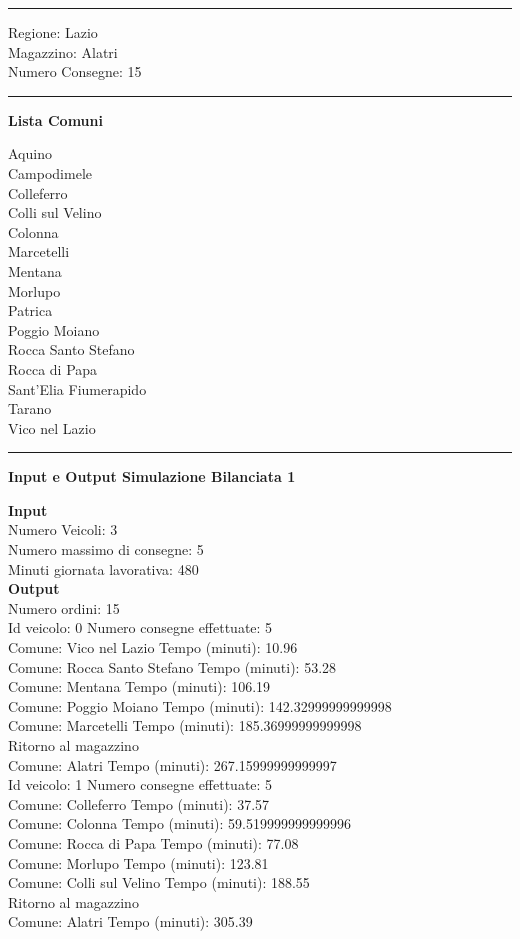 \documentclass[a4paper,12pt]{report}
\begin{document}
\hrule
Regione: Lazio\\
Magazzino: Alatri\\
Numero Consegne: 15\\
\hrule
\begin{center}
\textbf{Lista Comuni}
\end{center}
Aquino\\
Campodimele\\
Colleferro\\
Colli sul Velino\\
Colonna\\
Marcetelli\\
Mentana\\
Morlupo\\
Patrica\\
Poggio Moiano\\
Rocca Santo Stefano\\
Rocca di Papa\\
Sant'Elia Fiumerapido\\
Tarano\\
Vico nel Lazio\\
\hrule
\begin{center}
\textbf{Input e Output Simulazione Bilanciata 1}
\end{center}
\textbf{Input}\\
Numero Veicoli: 3\\
Numero massimo di consegne: 5\\
Minuti giornata lavorativa: 480\\
\textbf{Output}\\
Numero ordini: 15\\

Id veicolo: 0	Numero consegne effettuate: 5\\
Comune: Vico nel Lazio	 Tempo (minuti): 10.96\\
Comune: Rocca Santo Stefano	 Tempo (minuti): 53.28\\
Comune: Mentana	 Tempo (minuti): 106.19\\
Comune: Poggio Moiano	 Tempo (minuti): 142.32999999999998\\
Comune: Marcetelli	 Tempo (minuti): 185.36999999999998\\
Ritorno al magazzino\\
Comune: Alatri	 Tempo (minuti): 267.15999999999997\\

Id veicolo: 1	Numero consegne effettuate: 5\\
Comune: Colleferro	 Tempo (minuti): 37.57\\
Comune: Colonna	 Tempo (minuti): 59.519999999999996\\
Comune: Rocca di Papa	 Tempo (minuti): 77.08\\
Comune: Morlupo	 Tempo (minuti): 123.81\\
Comune: Colli sul Velino	 Tempo (minuti): 188.55\\
Ritorno al magazzino\\
Comune: Alatri	 Tempo (minuti): 305.39\\
\end{document}
